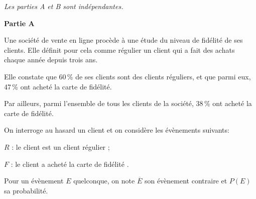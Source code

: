 \medskip

\emph{Les parties {\rm A} et {\rm B} sont indépendantes.}

\medskip

\textbf{Partie A}

\medskip

Une société de vente en ligne procède à une étude du niveau de fidélité de ses clients. Elle définit pour cela comme \og régulier\fg{} un client qui a fait des achats chaque année depuis trois ans.

Elle constate que 60\,\% de ses clients sont des clients réguliers, et que parmi eux, 47\,\% ont acheté la carte de fidélité.

Par ailleurs, parmi l'ensemble de tous les clients de la société, 38\,\% ont acheté la carte de fidélité.

\begin{list}{\textbullet}{On interroge au hasard un client et on considère les évènements suivants:}
\item $R$ : \og le client est un client régulier\fg{} ;
\item $F$ : \og le client a acheté la carte de fidélité \fg.
\end{list}



Pour un évènement $E$ quelconque, on note $\overline{E}$ son évènement contraire et $P(E)$ sa probabilité.

\medskip

